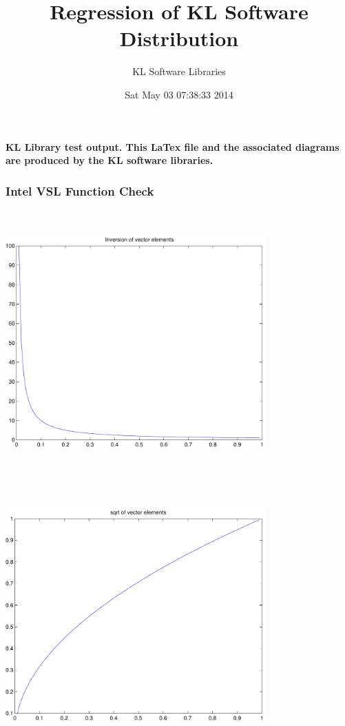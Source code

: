 \documentclass[9pt]{article}
\theoremstyle{plain}
\theoremstyle{definition}
\theoremstyle{remark}
\numberwithin{equation}{section}
\begin{document}
\title{Regression of KL Software Distribution   }
\author{KL Software Libraries}
\date{Sat May 03 07:38:33 2014
}
\maketitle
\textbf{ KL Library test output.  This LaTex file and the associated diagrams are produced by the KL software libraries.}
\subsubsection{Intel VSL Function Check}
\includegraphics[width=10.0cm,height=10.0cm]{klVSLInv.pdf}

\includegraphics[width=10.0cm,height=10.0cm]{klVSLSqrt.pdf}
\end{document}
